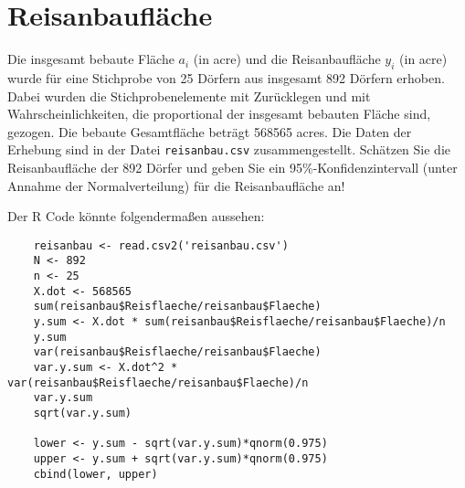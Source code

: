 \documentclass{article}
\begin{document}
\section{Reisanbaufläche}
Die insgesamt bebaute Fläche $a_i$ (in acre) und die Reisanbaufläche $y_i$ (in acre) wurde für eine Stichprobe von 25 Dörfern aus
insgesamt 892 Dörfern erhoben. Dabei wurden die Stichprobenelemente mit Zurücklegen und mit Wahrscheinlichkeiten, die proportional der insgesamt bebauten Fläche sind, gezogen. Die bebaute Gesamtfläche beträgt 568565 acres. Die Daten der Erhebung sind in der Datei \verb+reisanbau.csv+
zusammengestellt. Schätzen Sie die Reisanbaufläche der 892 Dörfer und geben Sie ein 95\%-Konfidenzintervall (unter Annahme der Normalverteilung) für die Reisanbaufläche an!
\begin{solution}
Der R Code könnte folgendermaßen aussehen:
	\begin{lstlisting}
	reisanbau <- read.csv2('reisanbau.csv')	
	N <- 892
	n <- 25
	X.dot <- 568565
	sum(reisanbau$Reisflaeche/reisanbau$Flaeche)
	y.sum <- X.dot * sum(reisanbau$Reisflaeche/reisanbau$Flaeche)/n
	y.sum
	var(reisanbau$Reisflaeche/reisanbau$Flaeche)
	var.y.sum <- X.dot^2 * var(reisanbau$Reisflaeche/reisanbau$Flaeche)/n
	var.y.sum
	sqrt(var.y.sum)
	
	lower <- y.sum - sqrt(var.y.sum)*qnorm(0.975)
	upper <- y.sum + sqrt(var.y.sum)*qnorm(0.975)
	cbind(lower, upper)
	\end{lstlisting}
\end{solution}
\end{document}
